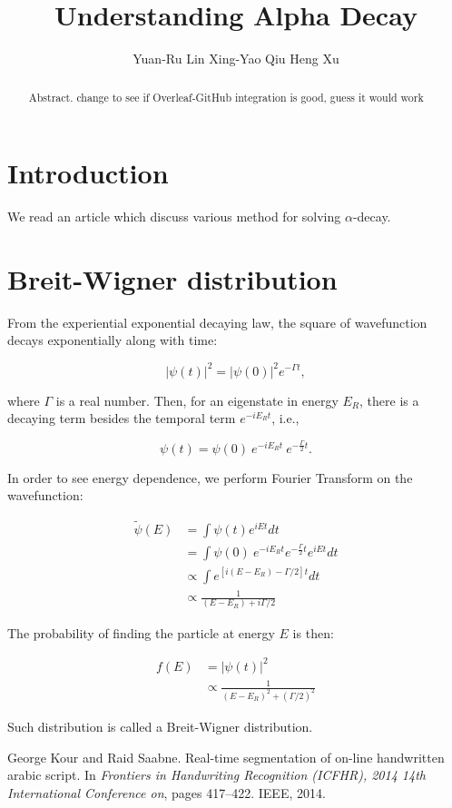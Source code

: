 \documentclass{article}
\title{Understanding Alpha Decay}
\author{
  Yuan-Ru Lin
   \And
  Xing-Yao Qiu
   \And
  Heng Xu
}
\begin{document}
\maketitle

\begin{abstract}
Abstract. change to see if Overleaf-GitHub integration is good, guess it would work
\end{abstract}

\section{Introduction}
We read an article which discuss various method for solving $\alpha$-decay. \cite{understandingAlphaDecay}

\section{Breit-Wigner distribution}
From the experiential exponential decaying law, the square of wavefunction decays exponentially along with time:

$$|\psi(t)|^2 = |\psi(0)|^2 e^{-\Gamma t},$$

where $\Gamma$ is a real number.
Then, for an eigenstate in energy $E_R$, there is a decaying term besides the temporal term $e^{-iE_Rt}$, i.e.,

$$\psi(t) = \psi(0) \ e^{-iE_Rt} \ e^{-\frac{\Gamma}{2} t}.$$ 

In order to see energy dependence, we perform Fourier Transform on the wavefunction:

\begin{align*}
\tilde{\psi}(E)
&= \int \psi(t) e^{iEt} dt \\
&= \int \psi(0) \ e^{-iE_Rt} e^{-\frac{\Gamma}{2} t} e^{iEt} dt\\
&\propto \int e^{[i(E-E_R)-\Gamma/2]t} dt \\
&\propto \frac{1}{(E-E_R)+i\Gamma/2}
\end{align*}

The probability of finding the particle at energy $E$ is then:

\begin{align*}
f(E) &= |\psi(t)|^2 \\
&\propto \frac{1}{(E-E_R)^2+(\Gamma/2)^2}
\end{align*}

Such distribution is called a Breit-Wigner distribution.


  
\begin{thebibliography}{1}
George Kour and Raid Saabne.
\newblock Real-time segmentation of on-line handwritten arabic script.
\newblock In {\em Frontiers in Handwriting Recognition (ICFHR), 2014 14th
  International Conference on}, pages 417--422. IEEE, 2014.

\end{thebibliography}
\end{document}
